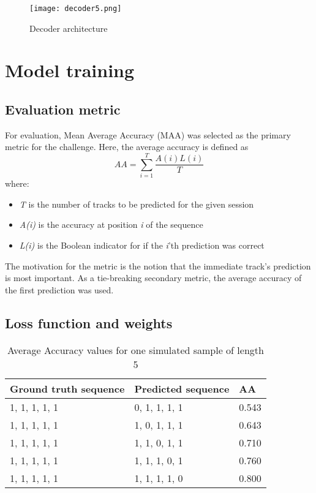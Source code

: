 \documentclass[sigconf]{acmart}
\begin{document}
\begin{figure}[h]
\caption{Decoder architecture}
\centering
\texttt{[image: decoder5.png]}
\end{figure}

\section{Model training}
\subsection{Evaluation metric}
For evaluation, Mean Average Accuracy (MAA) was selected as the primary metric for the challenge. Here, the average accuracy is defined as
\[ AA = \sum_{i=1}^T \frac{A(i)L(i)}{T} \]
where:
\begin{itemize}
    \item \textit{T} is the number of tracks to be predicted for the given session
    \item \textit{A(i)} is the accuracy at position \textit{i} of the sequence
    \item \textit{L(i)} is the Boolean indicator for if the \textit{i}'th prediction was correct
\end{itemize}

The motivation for the metric is the notion that the immediate track's prediction is most important. As a tie-breaking secondary metric, the average accuracy of the first prediction was used.

\subsection{Loss function and weights}

\begin{table}
\caption{Average Accuracy values for one simulated sample of length 5}
\begin{tabular}{|l|l|l|}
\cline{1-1} \cline{2-2} \cline{3-3}
Ground truth sequence & Predicted sequence & AA   \\ \hline
1, 1, 1, 1, 1         & 0, 1, 1, 1, 1      & 0.543 \\ \hline
1, 1, 1, 1, 1         & 1, 0, 1, 1, 1      & 0.643 \\ \hline
1, 1, 1, 1, 1         & 1, 1, 0, 1, 1      & 0.710  \\ \hline
1, 1, 1, 1, 1         & 1, 1, 1, 0, 1      & 0.760  \\ \hline
1, 1, 1, 1, 1         & 1, 1, 1, 1, 0      & 0.800   \\ \hline
\end{tabular}
\end{table}
\end{document}
